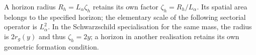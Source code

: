 A horizon radius \(R_h=L_\alpha\zeta_h\) retains its own
factor \(\zeta_h=R_h/L_\alpha\). Its spatial area belongs
to the specified horizon; the elementary scale of the following
sectorial operator is \(L_\alpha^2\). In the Schwarzschild
specialisation for the same mass, the radius is \(2r_g(y)\)
and thus \(\zeta_h=2y\); a horizon in another realisation
retains its own geometric formation condition.
